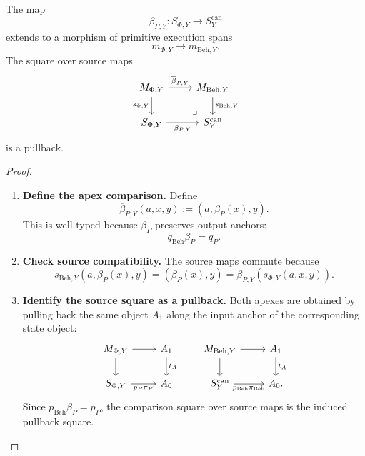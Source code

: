 \begin{proposition}
\label{prop:primitive-residual-comparison}
The map
\[
  \beta_{P,Y}:S_{\Phi,Y}\to S^{\mathrm{can}}_Y
\]
extends to a morphism of primitive execution spans
\[
  m_{\Phi,Y}\longrightarrow m_{\mathrm{Beh},Y}.
\]
The square over source maps
\[
\begin{tikzcd}
M_{\Phi,Y}
  \arrow[r, "\overline{\beta}_{P,Y}"]
  \arrow[d, "s_{\Phi,Y}"']
&
M_{\mathrm{Beh},Y}
  \arrow[d, "s_{\mathrm{Beh},Y}"]
\\
S_{\Phi,Y}
  \arrow[r, "\beta_{P,Y}"']
&
S^{\mathrm{can}}_Y
  \arrow[ul, phantom, very near start, "\lrcorner"]
\end{tikzcd}
\]
is a pullback.
\end{proposition}

\begin{proof}
\leavevmode
\begin{enumerate}
  \item \textbf{Define the apex comparison.}
  Define
  \[
    \overline{\beta}_{P,Y}(a,x,y)
    :=
    (a,\beta_P(x),y).
  \]
  This is well-typed because \(\beta_P\) preserves output anchors:
  \[
    q_{\mathrm{Beh}}\beta_P=q_P.
  \]

  \item \textbf{Check source compatibility.}
  The source maps commute because
  \[
    s_{\mathrm{Beh},Y}(a,\beta_P(x),y)
    =
    (\beta_P(x),y)
    =
    \beta_{P,Y}(s_{\Phi,Y}(a,x,y)).
  \]

  \item \textbf{Identify the source square as a pullback.}
  Both apexes are obtained by pulling back the same object \(A_1\) along the
  input anchor of the corresponding state object:
  \[
  \begin{tikzcd}
  M_{\Phi,Y}
    \arrow[r]
    \arrow[d]
  &
  A_1
    \arrow[d, "t_A"]
  \\
  S_{\Phi,Y}
    \arrow[r, "p_P\pi_P"']
  &
  A_0
  \end{tikzcd}
  \qquad
  \begin{tikzcd}
  M_{\mathrm{Beh},Y}
    \arrow[r]
    \arrow[d]
  &
  A_1
    \arrow[d, "t_A"]
  \\
  S^{\mathrm{can}}_Y
    \arrow[r, "p_{\mathrm{Beh}}\pi_{\mathrm{Beh}}"']
  &
  A_0 .
  \end{tikzcd}
  \]
  Since \(p_{\mathrm{Beh}}\beta_P=p_P\), the comparison square over source
  maps is the induced pullback square.


\end{enumerate}
\end{proof}
